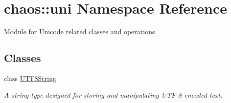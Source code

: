\hypertarget{namespacechaos_1_1uni}{}\section{chaos\+:\+:uni Namespace Reference}
\label{namespacechaos_1_1uni}


Module for Unicode related classes and operations.  


\subsection*{Classes}
\begin{DoxyCompactItemize}
\item 
class \hyperlink{classchaos_1_1uni_1_1_u_t_f8_string}{U\+T\+F8\+String}
\begin{DoxyCompactList}\small\item\em A string type designed for storing and manipulating U\+T\+F-\/8 encoded text. \end{DoxyCompactList}\end{DoxyCompactItemize}
